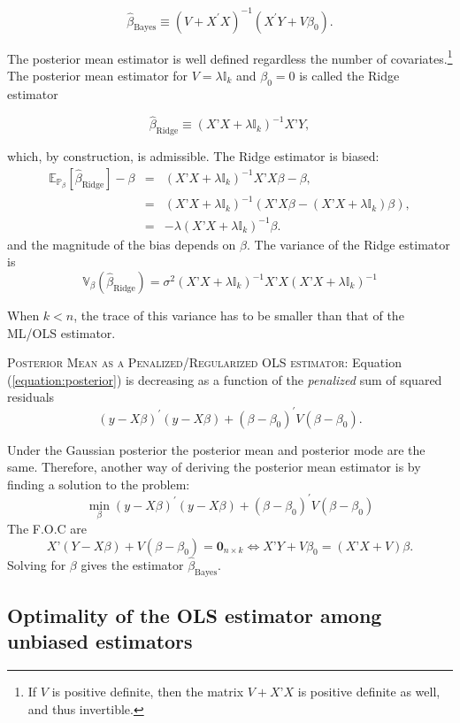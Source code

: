 \documentclass[11pt]{article} %
\begin{document}
\[ \widehat{\beta}_{\textrm{Bayes}} \equiv \left( V + X^{\prime} X \right)^{-1} \left( X^{\prime} Y + V \beta_0 \right). \]

\noindent The posterior mean estimator is well defined regardless the number of
covariates.\footnote{If $V$ is positive definite, then the matrix $V+ X’X$ is
  positive definite as well, and thus invertible.} The posterior mean estimator
for $V= \lambda \mathbb{I}_{k}$ and $\beta_0 = 0$ is called the Ridge estimator

\[  \widehat{\beta}_{\textrm{Ridge}} \equiv (X’X + \lambda \mathbb{I}_{k})^{-1} X’Y, \]

\noindent which, by construction, is admissible. The Ridge estimator is biased:
\begin{eqnarray*}
\mathbb{E}_{\mathbb{P}_{\beta}} [ \widehat{\beta}_{\textrm{Ridge}} ] - \beta &=& (X’X + \lambda \mathbb{I}_{k})^{-1} X’X\beta - \beta,  \\
&=& (X’X + \lambda \mathbb{I}_{k})^{-1} (X’X\beta - (X’X + \lambda \mathbb{I}_{k}) \beta), \\
&=& -\lambda (X’X + \lambda \mathbb{I}_k)^{-1} \beta.
\end{eqnarray*}
\noindent and the magnitude of the bias depends on $\beta$. The variance of the Ridge estimator is
\[ \mathbb{V}_{\beta} (\widehat{\beta}_{\textrm{Ridge}}) = \sigma^2( X’X + \lambda \mathbb{I}_k)^{-1} X’X ( X’X + \lambda \mathbb{I}_k)^{-1}  \]

\noindent When $k<n$, the trace of this variance has to be smaller than that of the ML/OLS estimator.

{\scshape Posterior Mean as a Penalized/Regularized OLS estimator:} \noindent Equation (\ref{equation:posterior}) is decreasing as a function of the \emph{penalized} sum of squared residuals 
\[ (y-X\beta)^{\prime} (y-X \beta) + (\beta-\beta_0)^{\prime} V (\beta-\beta_0). \]


\noindent Under the Gaussian posterior the posterior mean and posterior mode are the same. Therefore, another way of deriving the posterior mean estimator is by finding a solution to the problem:
\[ \min_{\beta} (y-X\beta)^{\prime} (y-X \beta) + (\beta-\beta_0)^{\prime} V (\beta-\beta_0) \]
The F.O.C are 
\[ X’(Y-X\beta) + V(\beta - \beta_0) = \textbf{0}_{n \times k} \iff  X’Y + V \beta_0 = (X’X + V) \beta. \]
\noindent Solving for $\beta$ gives the estimator $\widehat{\beta}_{\textrm{Bayes}}$. 

\subsection{Optimality of the OLS estimator among unbiased estimators}
\end{document}
